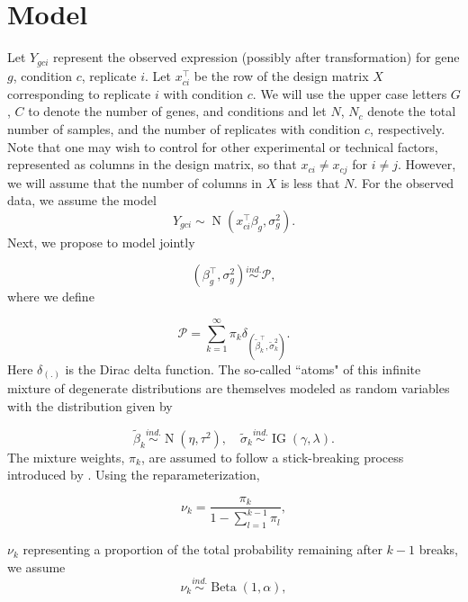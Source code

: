 \newcommand{\ind}{\stackrel{ind.}{\sim}}
\newcommand{\op}{\operatorname}

\section{Model}
Let $Y_{gci}$ represent the observed expression (possibly after transformation) for gene $g$, condition $c$, replicate $i$. Let $x_{ci}^\top$ be the row of the design matrix $X$ corresponding to replicate $i$ with condition $c$. We will use the upper case letters $G$, $C$ to denote the number of genes, and conditions and let $N$, $N_c$ denote the total number of samples, and the number of replicates with condition $c$, respectively. Note that one may wish to control for other experimental or technical factors, represented as columns in the design matrix, so that $x_{ci} \neq x_{cj}$ for $i \neq j$. However, we will assume that the number of columns in $X$ is less that $N$. For the observed data, we assume the model
\begin{equation}
Y_{gci} \sim \op{N} \left( x_{ci}^\top \beta_g, \sigma^2_g \right).
\end{equation}
Next, we propose to model jointly

\begin{equation}
\left(\beta_g^\top,\sigma^2_g\right) \ind \mathcal{P},
\end{equation}
where we define

\begin{equation}
\mathcal{P} =\sum_{k=1}^\infty \pi_k \delta_{\left(\tilde{\beta}_k^\top ,\tilde{\sigma}^2_k\right)}.
\end{equation}
Here $\delta_{(.)}$ is the Dirac delta function. The so-called ``atoms" of this infinite mixture of degenerate distributions are themselves modeled as random variables with the distribution given by

\begin{equation}
\tilde{\beta}_k \ind \op{N}(\eta, \tau^2),\quad \tilde{\sigma}_k \ind \op{IG}(\gamma, \lambda).
\end{equation}
The mixture weights, $\pi_k$,  are assumed to follow a stick-breaking process introduced by \citet{sethuraman}. Using the reparameterization,

\begin{equation}
\nu_k = \frac{\pi_k}{1 - \sum_{l=1}^{k-1} \pi_l},
\end{equation}

$\nu_k$ representing a proportion of the total probability remaining after $k-1$ breaks, we assume
\begin{equation}
\nu_k \ind \op{Beta}(1, \alpha),
\end{equation}

